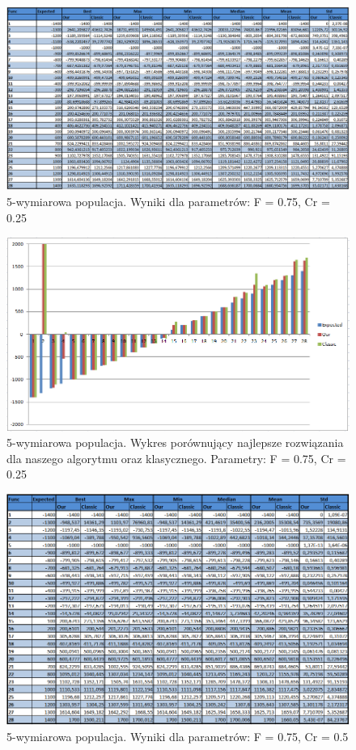 \documentclass[a4paper]{article}
\begin{document}
\begin{figure}
\centering
\includegraphics[width=\textwidth]{F75Cr25L5tab.png}
\caption{5-wymiarowa populacja. Wyniki dla parametrów: F = 0.75, Cr = 0.25}
\end{figure}

\begin{figure}
\centering
\includegraphics[width=\textwidth]{F75Cr25L5chart.png}
\caption{5-wymiarowa populacja. Wykres porównujący najlepsze rozwiązania dla naszego algorytmu oraz klasycznego. Parametry: F = 0.75, Cr = 0.25}
\end{figure}

\begin{figure}
\centering
\includegraphics[width=\textwidth]{F75Cr5L5tab.png}
\caption{5-wymiarowa populacja. Wyniki dla parametrów: F = 0.75, Cr = 0.5}
\end{figure}
\end{document}
